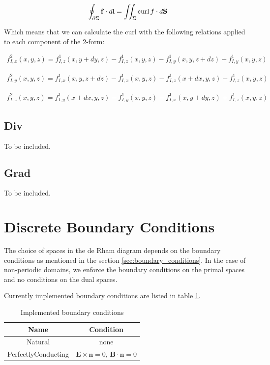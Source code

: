 \documentclass[11pt]{article}
\begin{document}
\begin{equation}
    \oint_{\partial \Sigma} \mathbf{f} \cdot d\mathbf{l} = \iint_{\Sigma} \operatorname{curl} f \cdot d\mathbf{S}
\end{equation}

Which means that we can calculate the curl with the following relations applied to each component of the 2-form:

\begin{align}
    f^2_{I,x}(x, y, z) = f^1_{I,z}(x, y + dy, z) - f^1_{I,z}(x, y, z) - f^1_{I,y}(x, y, z + dz) + f^1_{I,y}(x, y, z)
\end{align}

\begin{align}
    f^2_{I,y}(x, y, z) = f^1_{I,x}(x, y, z + dz) - f^1_{I,x}(x, y, z) - f^1_{I,z}(x + dx, y, z) + f^1_{I,z}(x, y, z)
\end{align}

\begin{align}
    f^2_{I,z}(x, y, z) = f^1_{I,y}(x + dx, y, z) - f^1_{I,y}(x, y, z) - f^1_{I,x}(x, y + dy, z) + f^1_{I,z}(x, y, z)
\end{align}

\subsection{Div}
To be included.

\subsection{Grad}
To be included.

\section{Discrete Boundary Conditions}
\label{sec:discrete_bc}

The choice of spaces in the de Rham diagram depends on the boundary conditions as mentioned in the section \ref{sec:boundary_conditions}. In the case of non-periodic domains, we enforce the boundary conditions on the primal spaces and no conditions on the dual spaces.

Currently implemented boundary conditions are listed in table \ref{tab:implemented_bc}.
\begin{table}[htbp]
    \label{tab:implemented_bc}
    \caption{Implemented boundary conditions}
    \centering
    \begin{tabular}{c|c}
        Name & Condition \\ \hline
        Natural & none \\
        PerfectlyConducting & $\boldsymbol{E} \times \boldsymbol{n} = 0$, $\boldsymbol{B} \cdot \boldsymbol{n} = 0$ \\
    \end{tabular}
\end{table}
\end{document}
